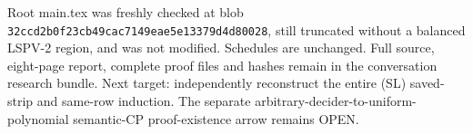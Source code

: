 \documentclass[11pt]{article}
\begin{document}
Root main.tex was freshly checked at blob \nolinkurl{32ccd2b0f23cb49cac7149eae5e13379d4d80028}, still truncated without a balanced LSPV-2 region, and was not modified. Schedules are unchanged. Full source, eight-page report, complete proof files and hashes remain in the conversation research bundle. Next target: independently reconstruct the entire (SL) saved-strip and same-row induction. The separate arbitrary-decider-to-uniform-polynomial semantic-CP proof-existence arrow remains OPEN.
\end{document}
